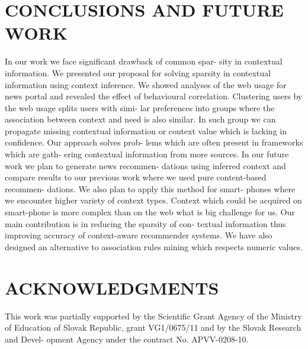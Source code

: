 \documentclass{acm_proc_article-sp}
\begin{document}
\section{CONCLUSIONS AND FUTURE WORK} 
In our work we face significant drawback of common spar-
sity in contextual information. We presented our proposal
for solving sparsity in contextual information using context
inference. We showed analyses of the web usage for news
portal and revealed the effect of behavioural correlation.
Clustering users by the web usage splits users with simi-
lar preferences into groups where the association between
context and need is also similar. In such group we can
propagate missing contextual information or context value
which is lacking in confidence. Our approach solves prob-
lems which are often present in frameworks which are gath-
ering contextual information from more sources.
In our future work we plan to generate news recommen-
dations using inferred context and compare results to our
previous work where we used pure content-based recommen-
dations. We also plan to apply this method for smart-
phones where we encounter higher variety of context types.
Context which could be acquired on smart-phone is more
complex than on the web what is big challenge for us.
Our main contribution is in reducing the sparsity of con-
textual information thus improving accuracy of context-aware
recommender systems. We have also designed an alternative
to association rules mining which respects numeric values.

\section{ACKNOWLEDGMENTS}
This work was partially supported by the Scientific Grant
Agency of the Ministry of Education of Slovak Republic,
grant VG1/0675/11 and by the Slovak Research and Devel-
opment Agency under the contract No. APVV-0208-10.





\balancecolumns
\end{document}
